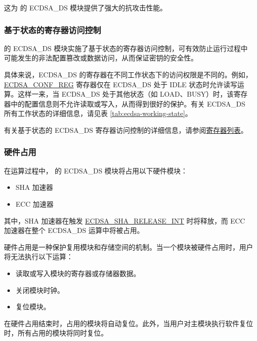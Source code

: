 \documentclass[main\_\_CN.tex]{subfiles}
\begin{document}
这为 \chipseries{} 的 ECDSA\_DS 模块提供了强大的抗攻击性能。

\subsubsection{基于状态的寄存器访问控制}

\chipseries{} 的 ECDSA\_DS 模块实施了基于状态的寄存器访问控制，可有效防止运行过程中可能发生的非法配置篡改或数据访问，从而保证密钥的安全性。

具体来说，ECDSA\_DS 的寄存器在不同工作状态下的访问权限是不同的。例如，\hyperref[regdesc:ECDSACONFREG]{ECDSA\_CONF\_REG} 寄存器仅在 ECDSA\_DS 处于 IDLE 状态时允许读写运算。这样一来，当 ECDSA\_DS 处于其他状态（如 LOAD、BUSY）时，该寄存器中的配置信息则不允许读取或写入，从而得到很好的保护。有关 ECDSA\_DS 所有工作状态的详细信息，请见表 \ref{tab:ecdsa-working-state}。

有关基于状态的 ECDSA\_DS 寄存器访问控制的详细信息，请参阅\hyperref[sec:ecdsa-reg-summ]{寄存器列表}。

\subsubsection{硬件占用}

在运算过程中，\chipname{} 的 ECDSA\_DS 模块将占用以下硬件模块：
\begin{itemize}
    \item SHA 加速器
    \item ECC 加速器
\end{itemize}
其中，SHA 加速器在触发 \hyperref[int:ECDSASHARELEASEINT]{ECDSA\_SHA\_RELEASE\_INT} 时将释放，而 ECC 加速器在整个 ECDSA\_DS 运算中将被占用。

\begin{tiplisting}
硬件占用是一种保护复用模块和存储空间的机制。当一个模块被硬件占用时，用户将无法执行以下运算：
\vspace{-0.5em}
\begin{itemize}
    \item 读取或写入模块的寄存器或存储器数据。
    \item 关闭模块时钟。
    \item 复位模块。
\end{itemize}
\vspace{-0.5em}
在硬件占用结束时，占用的模块将自动复位。此外，当用户对主模块执行软件复位时，所有占用的模块将同时复位。
\end{tiplisting}


\end{document}
